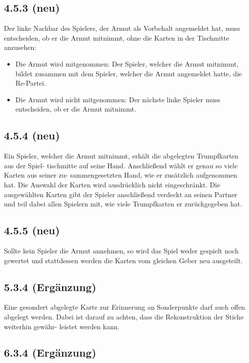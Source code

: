 \subsection*{4.5.3 (neu)}

Der linke Nachbar des Spielers, der Armut als Vorbehalt angemeldet hat,
muss entscheiden, ob er die Armut mitnimmt, ohne die Karten in der
Tischmitte anzusehen:

\begin{itemize}
	\item Die Armut wird mitgenommen: Der Spieler, welcher die Armut
		mitnimmt, bildet zusammen mit dem Spieler, welcher die Armut
		angemeldet hatte, die Re-Partei.
	\item Die Armut wird nicht mitgenommen: Der nächste linke Spieler
		muss entscheiden, ob er die Armut mitnimmt.
\end{itemize}

\subsection*{4.5.4 (neu)}

Ein Spieler, welcher die Armut mitnimmt, erhält die abgelegten
Trumpfkarten aus der Spiel- tischmitte auf seine Hand. Anschließend
wählt er genau so viele Karten aus seiner zu- sammengesetzten Hand, wie
er zusätzlich aufgenommen hat. Die Auswahl der Karten wird
ausdrücklich nicht eingeschränkt. Die ausgewählten Karten gibt der
Spieler anschließend verdeckt an seinen Partner und teil dabei allen
Spielern mit, wie viele Trumpfkarten er zurückgegeben hat.

\subsection*{4.5.5 (neu)}

Sollte kein Spieler die Armut annehmen, so wird das Spiel weder gespielt
noch gewertet und stattdessen werden die Karten vom gleichen Geber neu
ausgeteilt.

\subsection*{5.3.4 (Ergänzung)}

Eine gesondert abgelegte Karte zur Erinnerung an Sonderpunkte darf auch
offen abgelegt werden. Dabei ist darauf zu achten, dass die
Rekonstruktion der Stiche weiterhin gewähr- leistet werden kann.

\subsection*{6.3.4 (Ergänzung)}

